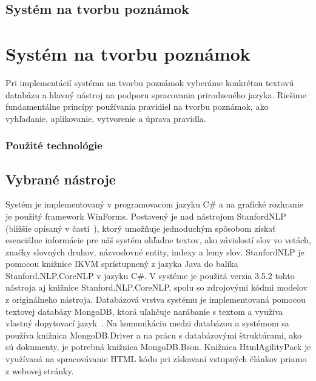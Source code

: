 \newpage
%
%
{
	\section{Systém na tvorbu poznámok}
}
{
	\chapter{Systém na tvorbu poznámok}
}
\label{implementation}
Pri implementácií systému na tvorbu poznámok vyberáme konkrétnu textovú databázu a hlavný nástroj na podporu spracovania prirodzeného jazyka. Riešime fundamentálne princípy používania pravidiel na tvorbu poznámok, ako vyhľadanie, aplikovanie, vytvorenie a úprava pravidla.

%
%
{
	\subsection{Použité technológie}
}
{
	\section{Vybrané nástroje}
}
\label{system:tools_chosen}
Systém je implementovaný v programovacom jazyku C\# a na grafické rozhranie je použitý framework WinForms. Postavený je nad nástrojom StanfordNLP (bližšie opísaný v časti~), ktorý umožňuje jednoduchým spôsobom získať esenciálne informácie pre náš systém ohľadne textov, ako závislostí slov vo vetách, značky slovných druhov, názvoslovné entity, indexy a lemy slov. StanfordNLP je pomocou knižnice IKVM sprístupnený z jazyka Java do balíka Stanford.NLP.CoreNLP v jazyku C\#. V systéme je použitá verzia 3.5.2 tohto nástroja aj knižnice Stanford.NLP.CoreNLP, spolu so zdrojovými kódmi modelov z originálneho nástroja. Databázová vrstva systému je implementovaná pomocou textovej databázy MongoDB, ktorá uľahčuje narábanie s textom a využíva vlastný dopytovací jazyk~\cite{NoSQLDBvsRealtionDB}. Na komunikáciu medzi databázou a systémom sa používa knižnica MongoDB.Driver a na prácu s databázovými štruktúrami, ako sú dokumenty, je potrebná knižnica MongoDB.Bson. Knižnica HtmlAgilityPack je využívaná na spracovávanie HTML kódu pri získavaní vstupných článkov priamo z webovej stránky.

